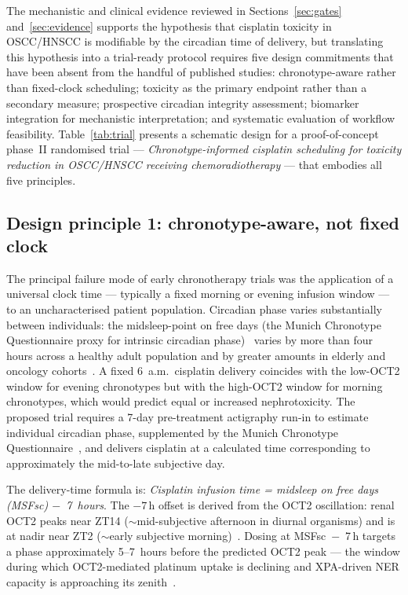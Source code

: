 \documentclass[preprint,review,12pt]{elsarticle}
\begin{document}

The mechanistic and clinical evidence reviewed in Sections~\ref{sec:gates}
and~\ref{sec:evidence} supports the hypothesis that cisplatin toxicity
in OSCC/HNSCC is modifiable by the circadian time of delivery, but
translating this hypothesis into a trial-ready protocol requires
five design commitments that have been absent from the handful of
published studies: chronotype-aware rather than fixed-clock scheduling;
toxicity as the primary endpoint rather than a secondary measure;
prospective circadian integrity assessment; biomarker integration for
mechanistic interpretation; and systematic evaluation of workflow
feasibility.  Table~\ref{tab:trial} presents a schematic design for a
proof-of-concept phase~II randomised trial --- \emph{Chronotype-informed
cisplatin scheduling for toxicity reduction in OSCC/HNSCC receiving
chemoradiotherapy} --- that embodies all five principles.

\subsection{Design principle 1: chronotype-aware, not fixed clock}

The principal failure mode of early chronotherapy trials was the
application of a universal clock time --- typically a fixed morning
or evening infusion window --- to an uncharacterised patient population.
Circadian phase varies substantially between individuals: the
midsleep-point on free days (the Munich Chronotype Questionnaire proxy
for intrinsic circadian phase)~\cite{Roenneberg2003} varies by more than
four hours across a healthy adult population and by greater amounts in
elderly and oncology cohorts~\cite{Innominato2014}.  A fixed 6~a.m.\
cisplatin delivery coincides with the low-OCT2 window for evening
chronotypes but with the high-OCT2 window for morning chronotypes,
which would predict equal or increased nephrotoxicity.
The proposed trial requires a 7-day pre-treatment actigraphy run-in
to estimate individual circadian phase, supplemented by the Munich
Chronotype Questionnaire~\cite{Roenneberg2003}, and delivers cisplatin
at a calculated time corresponding to approximately the mid-to-late
subjective day.

The delivery-time formula is: \emph{Cisplatin infusion time = midsleep on
free days (MSFsc) $-$~7~hours}.  The $-7$\,h offset is derived from the
OCT2 oscillation: renal OCT2 peaks near ZT14 ($\sim$mid-subjective
afternoon in diurnal organisms) and is at nadir near ZT2 ($\sim$early
subjective morning)~\cite{Oda2014}.  Dosing at MSFsc~$-$~7\,h targets a
phase approximately 5--7~hours before the predicted OCT2 peak --- the
window during which OCT2-mediated platinum uptake is declining and XPA-driven
NER capacity is approaching its zenith~\cite{Kang2010}.
\end{document}

